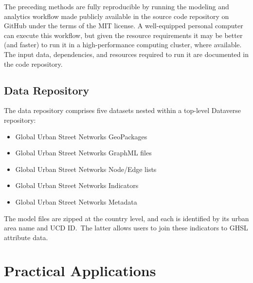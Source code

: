 \documentclass[12pt,letterpaper]{article} %
\begin{document}
The preceding methods are fully reproducible by running the modeling and analytics workflow made publicly available in the source code repository on GitHub under the terms of the MIT license. A well-equipped personal computer can execute this workflow, but given the resource requirements it may be better (and faster) to run it in a high-performance computing cluster, where available. The input data, dependencies, and resources required to run it are documented in the code repository.

\subsection{Data Repository}

The data repository comprises five datasets nested within a top-level Dataverse repository:

\begin{itemize}
    \item Global Urban Street Networks GeoPackages
    \item Global Urban Street Networks GraphML files
    \item Global Urban Street Networks Node/Edge lists
    \item Global Urban Street Networks Indicators 
    \item Global Urban Street Networks Metadata 
\end{itemize}

The model files are zipped at the country level, and each is identified by its urban area name and UCD ID.\ The latter allows users to join these indicators to GHSL attribute data.

\section{Practical Applications}
\end{document}
